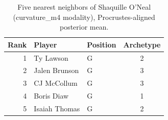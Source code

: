 \begin{table}[htbp]
  \centering\small
  \begin{tabular}{rllc}
    \toprule
    Rank & Player & Position & Archetype \\
    \midrule
    1 & Ty Lawson & G & 2 \\
    2 & Jalen Brunson & G & 3 \\
    3 & CJ McCollum & G & 3 \\
    4 & Boris Diaw & G & 1 \\
    5 & Isaiah Thomas & G & 2 \\
    \bottomrule
  \end{tabular}
  \caption{Five nearest neighbors of Shaquille O'Neal (curvature_m4 modality), Procrustes-aligned posterior mean.}
  \label{tab:Shaquille_O_Neal_neighbors_curvature_m4}
\end{table}

